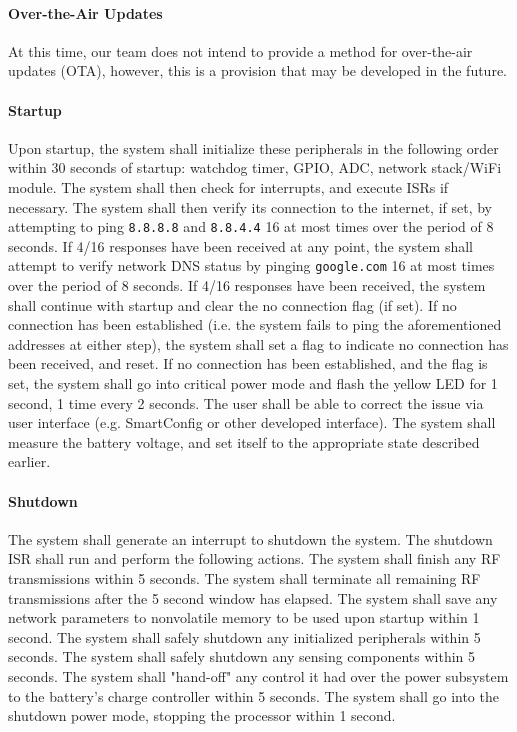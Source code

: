 \paragraph{Over-the-Air Updates}
At this time, our team does not intend to provide a method for over-the-air
updates (OTA), however, this is a provision that may be developed in the
future.

\paragraph{Startup} Upon startup, the system shall initialize these peripherals in the following order within 30 seconds of startup: watchdog timer, GPIO, ADC, network stack/WiFi module. The system shall then check for interrupts, and execute ISRs if necessary. The system shall then verify its connection to the internet, if set, by attempting to ping \texttt{8.8.8.8} and \texttt{8.8.4.4} 16 at most times over the period of 8 seconds. If 4/16 responses have been received at any point, the system shall attempt to verify network DNS status by pinging \texttt{google.com} 16 at most times over the period of 8 seconds. If 4/16 responses have been received, the system shall continue with startup and clear the no connection flag (if set). If no connection has been established (i.e. the system fails to ping the aforementioned addresses at either step), the system shall set a flag to indicate no connection has been received, and reset. If no connection has been established, and the flag is set, the system shall go into critical power mode and flash the yellow LED for 1 second, 1 time every 2 seconds. The user shall be able to correct the issue via user interface (e.g. SmartConfig or other developed interface). The system shall measure the battery voltage, and set itself to the appropriate state described earlier.

\paragraph{Shutdown} The system shall generate an interrupt to shutdown the system. The shutdown ISR shall run and perform the following actions. The system shall finish any RF transmissions within 5 seconds. The system shall terminate all remaining RF transmissions after the 5 second window has elapsed. The system shall save any network parameters to nonvolatile memory to be used upon startup within 1 second. The system shall safely shutdown any initialized peripherals within 5 seconds. The system shall safely shutdown any sensing components within 5 seconds. The system shall "hand-off" any control it had over the power subsystem to the battery's charge controller within 5 seconds. The system shall go into the shutdown power mode, stopping the processor within 1 second.

